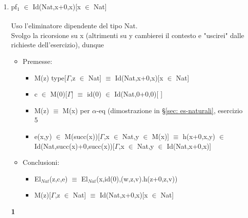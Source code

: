 \begin{enumerate}
\item pf$_1$ $\in$ Id(Nat,x+0,x)[x $\in$ Nat]\\\\
\noindent
Uso l'eliminatore dipendente del tipo Nat.\\
Svolgo la ricorsione su x (altrimenti su y cambierei il contesto e "uscirei" dalle richieste dell'esercizio), dunque
\begin{itemize}
\item Premesse:
\begin{itemize}
\item M(z) type[$\Gamma$,z $\in$ Nat] $\equiv$ Id(Nat,x+0,x)[x $\in$ Nat]
\item c $\in$ M(0)[$\Gamma$] $\equiv$ id(0) $\in$ Id(Nat,0+0,0)[ ]
\item M(z) $\equiv$ M(x) per $\alpha$-eq (dimostrazione in \S\ref{sec: es-naturali}, esercizio 5
\item e(x,y) $\in$ M(succ(x))[$\Gamma$,x $\in$ Nat,y $\in$ M(x)] $\equiv$ h(x+0,x,y) $\in$ Id(Nat,succ(x)+0,succ(x))[$\Gamma$,x $\in$ Nat,y $\in$ Id(Nat,x+0,x)]
\end{itemize}
\item Conclusioni:
\begin{itemize}
\item El$_{Nat}$(z,c,e) $\equiv$ El$_{Nat}$(x,id(0),(w,z,v).h(z+0,z,v))
\item M(z)[$\Gamma$,z $\in$ Nat] $\equiv$ Id(Nat,x+0,x)[x $\in$ Nat]
\end{itemize}
\end{itemize}
\noindent


\small
\begin{adjustwidth}{-12.5em}{}
\begin{prooftree}

\end{prooftree}
\end{adjustwidth}
\vspace{0.5cm}
\normalsize \textbf{1}
\small
\begin{prooftree}



\end{prooftree}
\end{enumerate}
